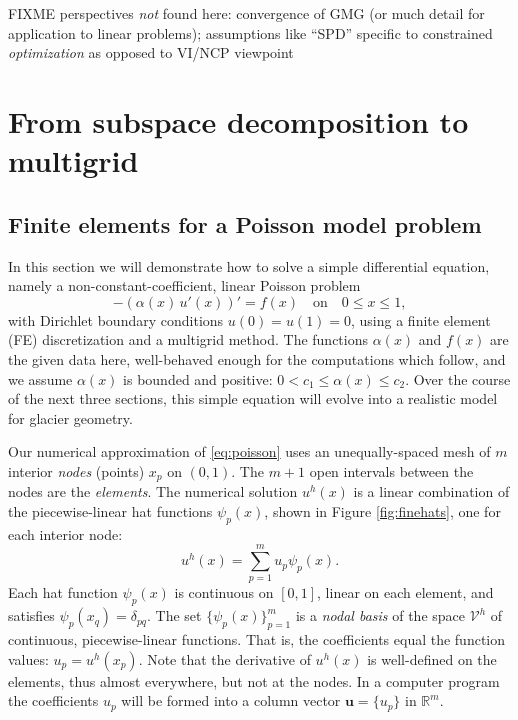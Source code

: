 \documentclass[letterpaper,final,12pt,reqno]{amsart}
\newcommand{\RR}{\mathbb{R}}
\newcommand{\bu}{\mathbf{u}}
\numberwithin{equation}{section}
\numberwithin{figure}{section}
\numberwithin{table}{section}
\begin{document}
FIXME perspectives \emph{not} found here: convergence of GMG (or much detail for application to linear problems); assumptions like ``SPD'' specific to constrained \emph{optimization} as opposed to VI/NCP viewpoint


\section{From subspace decomposition to multigrid} \label{sec:subspace}

\subsection*{Finite elements for a Poisson model problem}  In this section we will demonstrate how to solve a simple differential equation, namely a non-constant-coefficient, linear Poisson problem
\begin{equation}
- (\alpha(x)\,u'(x))' = f(x) \quad \text{on} \quad 0 \le x \le 1, \label{eq:poisson}
\end{equation}
with Dirichlet boundary conditions $u(0)=u(1)=0$, using a finite element (FE) discretization and a multigrid method.  The functions $\alpha(x)$ and $f(x)$ are the given data here, well-behaved enough for the computations which follow, and we assume $\alpha(x)$ is bounded and positive: $0 < c_1 \le \alpha(x) \le c_2$.  Over the course of the next three sections, this simple equation will evolve into a realistic model for glacier geometry.

Our numerical approximation of \eqref{eq:poisson} uses an unequally-spaced mesh of $m$ interior \emph{nodes} (points) $x_p$ on $(0,1)$.  The $m+1$ open intervals between the nodes are the \emph{elements}.  The numerical solution $u^h(x)$ is a linear combination of the piecewise-linear hat functions $\psi_p(x)$, shown in Figure \ref{fig:finehats}, one for each interior node:
\begin{equation}
u^h(x) = \sum_{p=1}^m u_p \psi_p(x). \label{eq:trialsolution}
\end{equation}
Each hat function $\psi_p(x)$ is continuous on $[0,1]$, linear on each element, and satisfies $\psi_p(x_q) = \delta_{pq}$.  The set $\{\psi_p(x)\}_{p=1}^m$ is a \emph{nodal basis} of the space $\mathcal{V}^h$ of continuous, piecewise-linear functions.  That is, the coefficients equal the function values: $u_p=u^h(x_p)$.  Note that the derivative of $u^h(x)$ is well-defined on the elements, thus almost everywhere, but not at the nodes.  In a computer program the coefficients $u_p$ will be formed into a column vector $\bu=\{u_p\}$ in $\RR^m$.
\end{document}

